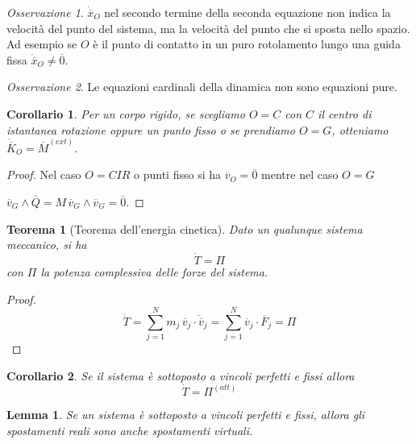 \documentclass{book}
\theoremstyle{plain}
\newtheorem{teo}{Teorema}[chapter]
\theoremstyle{plain}
\newtheorem*{lemma}{Lemma}
\theoremstyle{plain}
\theoremstyle{plain}
\newtheorem*{cor}{Corollario}
\theoremstyle{plain}
\theoremstyle{definition}
\theoremstyle{remark}
\newtheorem*{oss}{Osservazione}
\theoremstyle{definition}
\begin{document}
\begin{oss}
    $\dot{\overline{x}}_O$ nel secondo termine della seconda equazione non indica la velocità del punto del sistema, ma la velocità del punto che si sposta nello spazio. Ad esempio se $O$ è il punto di contatto in un puro rotolamento lungo una guida fissa  $\dot{\overline{x}}_O \neq \overline{0}$.
\end{oss}

\begin{oss}
    Le equazioni cardinali della dinamica non sono equazioni pure.
\end{oss}

\begin{cor}
    Per un corpo rigido, se scegliamo $O=C$ con $C$ il centro di istantanea rotazione oppure un punto fisso o se prendiamo $O=G$, otteniamo $\dot{\overline{K}}_O=\overline{M}^{(ext)}$.
\end{cor}

\begin{proof}
    Nel caso $O=CIR$ o punti fisso si ha $\overline{v}_O=\overline{0}$ mentre nel caso $O=G$
    
    \noindent $\overline{v}_G\wedge\overline{Q}=M\,\overline{v}_G\wedge\overline{v}_G=\overline{0}$.
\end{proof}

\begin{teo}[Teorema dell'energia cinetica]
    Dato un qualunque sistema meccanico, si ha
    \begin{displaymath}
    \boxed{
        \dot{T}=\Pi
        }
    \end{displaymath}
    con $\Pi$ la potenza complessiva delle forze del sistema.
\end{teo}

\begin{proof}
    \begin{displaymath}
        \Dot{T}=\sum_{j=1}^Nm_j\,\overline{v}_j\cdot\dot{\overline{v}}_j=\sum_{j=1}^N\overline{v}_j\cdot\overline{F}_j=\Pi
    \end{displaymath}
\end{proof}

\begin{cor}
    Se il sistema è sottoposto a vincoli perfetti e fissi allora
    \begin{displaymath}
    \boxed{
        \dot{T}=\Pi^{(att)}
        }
    \end{displaymath}
\end{cor}

\begin{lemma}
    Se un sistema è sottoposto a vincoli perfetti e fissi, allora gli spostamenti reali sono anche spostamenti virtuali.
\end{lemma}
\end{document}
